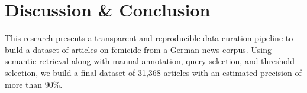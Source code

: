 \documentclass{article}
\begin{document}
\section{Discussion \& Conclusion}\label{sec:conclusion}




This research presents a transparent and reproducible data curation pipeline to build a dataset of articles on femicide from a German news corpus. Using semantic retrieval along with manual annotation, query selection, and threshold selection, we build a final dataset of 31,368 articles with an estimated precision of more than 90\%.
\end{document}
